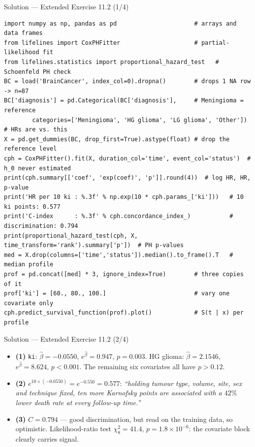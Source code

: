 \documentclass[aspectratio=169,11pt]{beamer}
\begin{document}
\begin{frame}[fragile]{Solution --- Extended Exercise 11.2 (1/4)}
\begin{solutionbox}
\begin{lstlisting}[basicstyle=\ttfamily\scriptsize]
import numpy as np, pandas as pd                      # arrays and data frames
from lifelines import CoxPHFitter                     # partial-likelihood fit
from lifelines.statistics import proportional_hazard_test   # Schoenfeld PH check
BC = load('BrainCancer', index_col=0).dropna()        # drops 1 NA row -> n=87
BC['diagnosis'] = pd.Categorical(BC['diagnosis'],     # Meningioma = reference
        categories=['Meningioma', 'HG glioma', 'LG glioma', 'Other'])  # HRs are vs. this
X = pd.get_dummies(BC, drop_first=True).astype(float) # drop the reference level
cph = CoxPHFitter().fit(X, duration_col='time', event_col='status')  # h_0 never estimated
print(cph.summary[['coef', 'exp(coef)', 'p']].round(4))  # log HR, HR, p-value
print('HR per 10 ki : %.3f' % np.exp(10 * cph.params_['ki']))   # 10 ki points: 0.577
print('C-index      : %.3f' % cph.concordance_index_)           # discrimination: 0.794
print(proportional_hazard_test(cph, X, time_transform='rank').summary['p'])  # PH p-values
med = X.drop(columns=['time','status']).median().to_frame().T   # median profile
prof = pd.concat([med] * 3, ignore_index=True)        # three copies of it
prof['ki'] = [60., 80., 100.]                         # vary one covariate only
cph.predict_survival_function(prof).plot()            # S(t | x) per profile
\end{lstlisting}
\end{solutionbox}
\end{frame}

\begin{frame}{Solution --- Extended Exercise 11.2 (2/4)}
\begin{solutionbox}
  \begin{itemize}
    \item \textbf{(1)} \texttt{ki}: $\hat\beta=-0.0550$, $e^{\hat\beta}=0.947$,
          $p=0.003$. HG glioma: $\hat\beta=2.1546$, $e^{\hat\beta}=8.624$, $p<0.001$.
          The remaining six covariates all have $p>0.12$.
    \item \textbf{(2)} $e^{10\times(-0.0550)}=e^{-0.550}=0.577$: \emph{``holding tumour
          type, volume, site, sex and technique fixed, ten more Karnofsky points are
          associated with a $42\%$ lower death rate at every follow-up time.''}
    \item \textbf{(3)} $C=0.794$ --- good discrimination, but read on the training data,
          so optimistic. Likelihood-ratio test $\chi^2_8=41.4$,
          $p=1.8\times10^{-6}$: the covariate block clearly carries signal.
  \end{itemize}
\end{solutionbox}
\end{frame}
\end{document}
